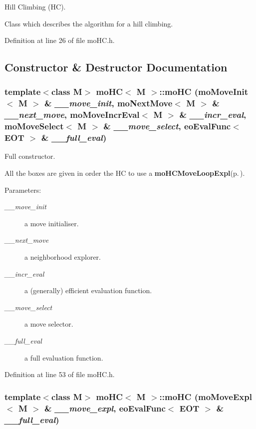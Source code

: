 Hill Climbing (HC). 

Class which describes the algorithm for a hill climbing. 



Definition at line 26 of file mo\-HC.h.

\subsection{Constructor \& Destructor Documentation}
\subsubsection{\setlength{\rightskip}{0pt plus 5cm}template$<$class M$>$ {\bf mo\-HC}$<$ M $>$::{\bf mo\-HC} ({\bf mo\-Move\-Init}$<$ M $>$ \& {\em \_\-\_\-move\_\-init}, {\bf mo\-Next\-Move}$<$ M $>$ \& {\em \_\-\_\-next\_\-move}, {\bf mo\-Move\-Incr\-Eval}$<$ M $>$ \& {\em \_\-\_\-incr\_\-eval}, {\bf mo\-Move\-Select}$<$ M $>$ \& {\em \_\-\_\-move\_\-select}, eo\-Eval\-Func$<$ {\bf EOT} $>$ \& {\em \_\-\_\-full\_\-eval})\hspace{0.3cm}{\tt  [inline]}}\label{classmo_h_c_6cafe093f86a80c225827884cb9dc5b7}


Full constructor. 

All the boxes are given in order the HC to use a {\bf mo\-HCMove\-Loop\-Expl}{\rm (p.\,\pageref{classmo_h_c_move_loop_expl})}.

\begin{Desc}
\item[Parameters:]
\begin{description}
\item[{\em \_\-\_\-move\_\-init}]a move initialiser. \item[{\em \_\-\_\-next\_\-move}]a neighborhood explorer. \item[{\em \_\-\_\-incr\_\-eval}]a (generally) efficient evaluation function. \item[{\em \_\-\_\-move\_\-select}]a move selector. \item[{\em \_\-\_\-full\_\-eval}]a full evaluation function. \end{description}
\end{Desc}


Definition at line 53 of file mo\-HC.h.
\subsubsection{\setlength{\rightskip}{0pt plus 5cm}template$<$class M$>$ {\bf mo\-HC}$<$ M $>$::{\bf mo\-HC} ({\bf mo\-Move\-Expl}$<$ M $>$ \& {\em \_\-\_\-move\_\-expl}, eo\-Eval\-Func$<$ {\bf EOT} $>$ \& {\em \_\-\_\-full\_\-eval})\hspace{0.3cm}{\tt  [inline]}}\label{classmo_h_c_45f27309792e584a27fa6dcb86ccda65}


